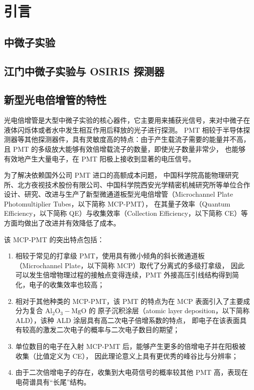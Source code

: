 
\chapter{引言}

\section{中微子实验}

\section{江门中微子实验与 OSIRIS 探测器}

\section{新型光电倍增管的特性}
光电倍增管是大型中微子实验的核心器件，它主要用来捕获光信号，来对中微子在液体闪烁体或者水中发生相互作用后释放的光子进行探测。
PMT 相较于半导体探测器等其他探测器件，具有灵敏度高的特点：由于产生载流子需要的能量并不高，
且 PMT 的多级放大能够有效倍增载流子的数量，即使光子数量非常少，
也能够有效地产生大量电子，在 PMT 阳极上接收到显著的电压信号。

为了解决依赖国外公司 PMT 进口的高额成本问题，
中国科学院高能物理研究所、北方夜视技术股份有限公司、中国科学院西安光学精密机械研究所等单位合作
设计、研究、改进与生产了新型微通道板型光电倍增管（Microchannel Plate Photomultiplier Tubes，以下简称 MCP-PMT），
在其量子效率（Quantum Efficiency，以下简称 QE）与收集效率（Collection Efficiency，以下简称 CE）等方面均做出了改进并有效降低了成本。

该 MCP-PMT 的突出特点包括：
\begin{enumerate}
    \item 相较于常见的打拿级 PMT，使用具有微小倾角的斜长微通道板（Microchannel Plate，以下简称 MCP）取代了分离式的多级打拿级，
    因此可以发生倍增物理过程的接触点变得连续，PMT 外接高压引线结构得到简化，电子的收集效率也较高；
    \item 相对于其他种类的 MCP-PMT，该 PMT 的特点为在 MCP 表面引入了主要成分为复合 $\text{Al}_2\text{O}_3-\text{MgO}$ 的
    原子沉积涂层（atomic layer deposition，以下简称 ALD），该种 ALD 涂层具有高二次电子倍增系数的特点，
    即电子在该表面具有较高的激发二次电子的概率与二次电子数目的期望；
    \item 单位数目的电子在入射 MCP-PMT 后，能够产生更多的倍增电子并在阳极被收集（比值定义为 CE），
    因此理论意义上具有更优秀的峰谷比与分辨率；
    \item 由于二次倍增电子的存在，收集到大电荷信号的概率较其他 PMT 高，表现在电荷谱具有“长尾”结构。
\end{enumerate}

